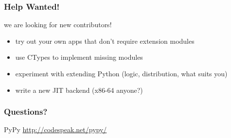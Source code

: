 \documentclass[utf8x]{beamer}
\begin{document}

\begin{frame}
  \frametitle{Help Wanted!}
  we are looking for new contributors!
  \begin{itemize}
  \item try out your own apps that don't require extension modules
  \item use CTypes to implement missing modules
  \item experiment with extending Python (logic, distribution, what suits you)
  \item write a new JIT backend (x86-64 anyone?)
  \end{itemize}
\end{frame}

\begin{frame}
  \frametitle{Questions?}
  \begin{block}{
    PyPy}
    \bigskip
    \hskip 1cm \url{http://codespeak.net/pypy/}
    \bigskip
  \end{block}
\end{frame}
\end{document}
